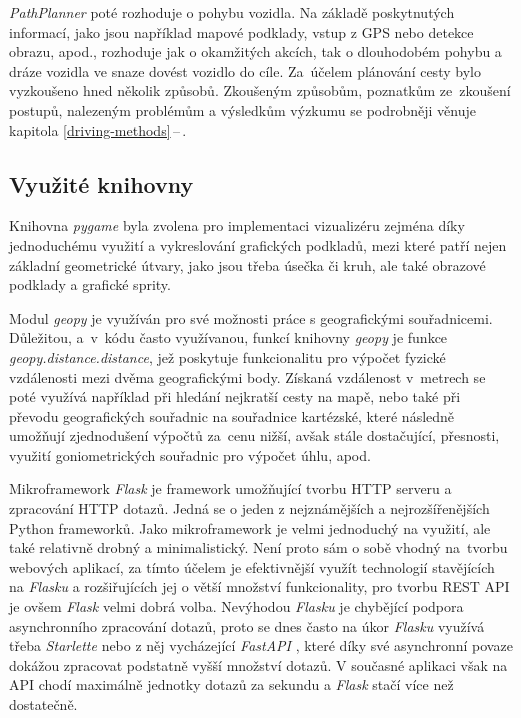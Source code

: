 \documentclass[czech, bachelor]{diploma}
\newcommand{\peteref}[1]{\ref{#1}\,--\,\nameref{#1}}
\begin{document}
\emph{PathPlanner} poté rozhoduje o pohybu vozidla. Na základě poskytnutých informací, jako jsou například mapové podklady, vstup
z GPS nebo detekce obrazu, apod., rozhoduje jak o okamžitých akcích, tak o dlouhodobém pohybu a dráze vozidla ve snaze dovést
vozidlo do cíle. Za~účelem plánování cesty bylo vyzkoušeno hned několik způsobů. Zkoušeným způsobům, poznatkům ze~zkoušení
postupů, nalezeným problémům a výsledkům výzkumu se podrobněji věnuje kapitola \peteref{driving-methods}.

\subsection{Využité knihovny}

Knihovna \emph{pygame} \cite{pygame-source} byla zvolena pro implementaci vizualizéru zejména díky jednoduchému využití a
vykreslování grafických podkladů, mezi které patří nejen základní geometrické útvary, jako jsou třeba úsečka či kruh, ale také
obrazové podklady a grafické sprity.

Modul \emph{geopy} \cite{geopy-source} je využíván pro své možnosti práce s geografickými souřadnicemi. Důležitou, a~v~kódu často
využívanou, funkcí knihovny \emph{geopy} je funkce \emph{geopy.distance.distance}, jež poskytuje funkcionalitu pro výpočet fyzické
vzdálenosti mezi dvěma geografickými body. Získaná vzdálenost v~metrech se poté využívá například při hledání nejkratší cesty
na mapě, nebo také při převodu geografických souřadnic na souřadnice kartézské, které následně umožňují zjednodušení výpočtů
za~cenu nižší, avšak stále dostačující, přesnosti, využití goniometrických souřadnic pro výpočet úhlu, apod.

Mikroframework \emph{Flask} \cite{flask-source} je framework umožňující tvorbu HTTP serveru a zpracování HTTP dotazů. Jedná
se o jeden z nejznámějších a nejrozšířenějších Python frameworků. Jako mikroframework je velmi jednoduchý na využití, ale také
relativně drobný a minimalistický. Není proto sám o sobě vhodný na~tvorbu webových aplikací, za tímto účelem je efektivnější
využít technologií stavějících na \emph{Flasku} a rozšiřujících jej o větší množství funkcionality, pro tvorbu REST API je
ovšem \emph{Flask} velmi dobrá volba. Nevýhodou \emph{Flasku} je chybějící podpora asynchronního zpracování dotazů, proto se dnes
často na úkor \emph{Flasku} využívá třeba \emph{Starlette} \cite{starlette-source} nebo z něj vycházející \emph{FastAPI} \cite{
fastapi-source}, které díky své asynchronní povaze dokážou zpracovat podstatně vyšší množství dotazů. V současné aplikaci však
na API chodí maximálně jednotky dotazů za sekundu a \emph{Flask} stačí více než dostatečně.
\end{document}
